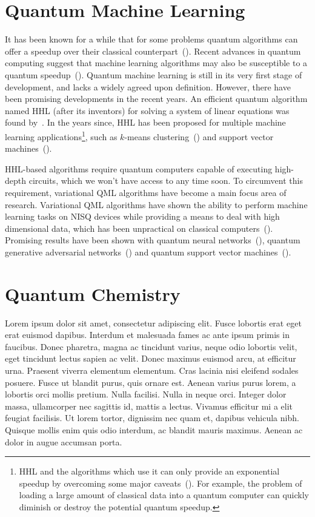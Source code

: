 \documentclass[a4paper,10pt]{article}
\begin{document}
\section{Quantum Machine Learning} \label{sec:quantum-ml}
It has been known for a while that for some problems quantum algorithms can offer a speedup over their classical counterpart~(\cite{nielsen-chuang}).
Recent advances in quantum computing suggest that machine learning algorithms may also be susceptible to a quantum speedup~(\cite{lee2019experimental, lloyd2013quantum, gao2018quantum}).
Quantum machine learning is still in its very first stage of development, and lacks a widely agreed upon definition.
However, there have been promising developments in the recent years.
An efficient quantum algorithm named HHL (after its inventors) for solving a system of linear equations was found by~\cite{harrow2009quantum}.
In the years since, HHL has been proposed for multiple machine learning applications\footnote{HHL and the algorithms which use it can only provide an exponential speedup by overcoming some major caveats~(\cite{aaronson2015read}). For example, the problem of loading a large amount of classical data into a quantum computer can quickly diminish or destroy the potential quantum speedup.}, such as $k$-means clustering~(\cite{lloyd2013quantum}) and support vector machines~(\cite{rebentrost2014quantum}).

HHL-based algorithms require quantum computers capable of executing high-depth circuits, which we won't have access to any time soon.
To circumvent this requirement, variational QML algorithms have become a main focus area of research.
Variational QML algorithms have shown the ability to perform machine learning tasks on NISQ devices while providing a means to deal with high dimensional data, which has been unpractical on classical computers~(\cite{mitarai2018quantum}).
Promising results have been shown with quantum neural networks~(\cite{qnn-near-term, schuld2018circuit, fanizza2019optimal}), quantum generative adversarial networks~(\cite{romero2019variational, benedetti2019adversarial}) and quantum support vector machines~(\cite{havlivcek2019supervised, schuld2019quantum}).

\section{Quantum Chemistry} \label{sec:quantum-chemistry}
Lorem ipsum dolor sit amet, consectetur adipiscing elit. Fusce lobortis erat eget erat euismod dapibus. Interdum et malesuada fames ac ante ipsum primis in faucibus. Donec pharetra, magna ac tincidunt varius, neque odio lobortis velit, eget tincidunt lectus sapien ac velit. Donec maximus euismod arcu, at efficitur urna. Praesent viverra elementum elementum. Cras lacinia nisi eleifend sodales posuere. Fusce ut blandit purus, quis ornare est. Aenean varius purus lorem, a lobortis orci mollis pretium. Nulla facilisi. Nulla in neque orci. Integer dolor massa, ullamcorper nec sagittis id, mattis a lectus. Vivamus efficitur mi a elit feugiat facilisis. Ut lorem tortor, dignissim nec quam et, dapibus vehicula nibh. Quisque mollis enim quis odio interdum, ac blandit mauris maximus. Aenean ac dolor in augue accumsan porta.
\end{document}

